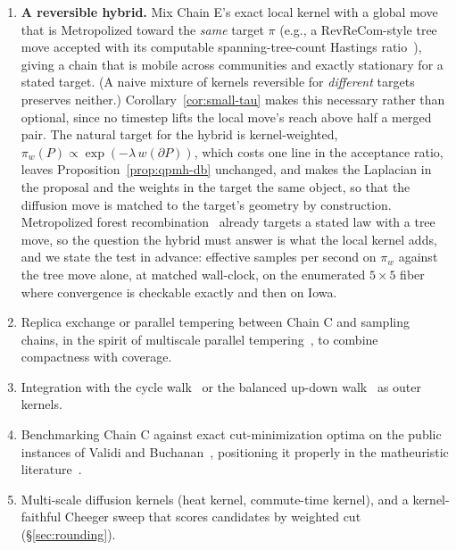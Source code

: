 \documentclass[11pt]{article}
\begin{document}
\begin{enumerate}
  \item \textbf{A reversible hybrid.} Mix Chain E's exact local
    kernel with a global move that is Metropolized toward the
    \emph{same} target $\pi$ (e.g., a RevReCom-style tree move
    accepted with its computable spanning-tree-count Hastings
    ratio~\cite{cannon2022spanning,autry2023metropolized}), giving a
    chain that is mobile across communities and exactly stationary for a
    stated target. (A naive mixture of kernels reversible for
    \emph{different} targets preserves neither.)
    Corollary~\ref{cor:small-tau} makes this necessary rather than
    optional, since no timestep lifts the local move's reach above
    half a merged pair. The natural target for the hybrid is
    kernel-weighted, $\pi_w(P) \propto \exp(-\lambda\, w(\partial P))$,
    which costs one line in the acceptance ratio, leaves
    Proposition~\ref{prop:qpmh-db} unchanged, and makes the Laplacian
    in the proposal and the weights in the target the same object, so
    that the diffusion move is matched to the target's geometry by
    construction. Metropolized forest
    recombination~\cite{autry2023metropolized} already targets a
    stated law with a tree move, so the question the hybrid must
    answer is what the local kernel adds, and we state the test in
    advance: effective samples per second on $\pi_w$ against the tree
    move alone, at matched wall-clock, on the enumerated
    $5 \times 5$ fiber where convergence is checkable exactly and
    then on Iowa.
  \item Replica exchange or parallel tempering between Chain C and
    sampling chains, in the spirit of multiscale parallel
    tempering~\cite{chuang2025multiscale}, to combine compactness with
    coverage.
  \item Integration with the cycle walk~\cite{deford2025cycle} or the
    balanced up-down walk~\cite{akitaya2026bud} as outer kernels.
  \item Benchmarking Chain C against exact cut-minimization optima on
    the public instances of Validi and
    Buchanan~\cite{validi2022political}, positioning it properly in
    the matheuristic literature~\cite{brous2025recom}.
  \item Multi-scale diffusion kernels (heat kernel, commute-time
    kernel), and a kernel-faithful Cheeger sweep that scores
    candidates by weighted cut (\S\ref{sec:rounding}).
\end{enumerate}

\end{document}
